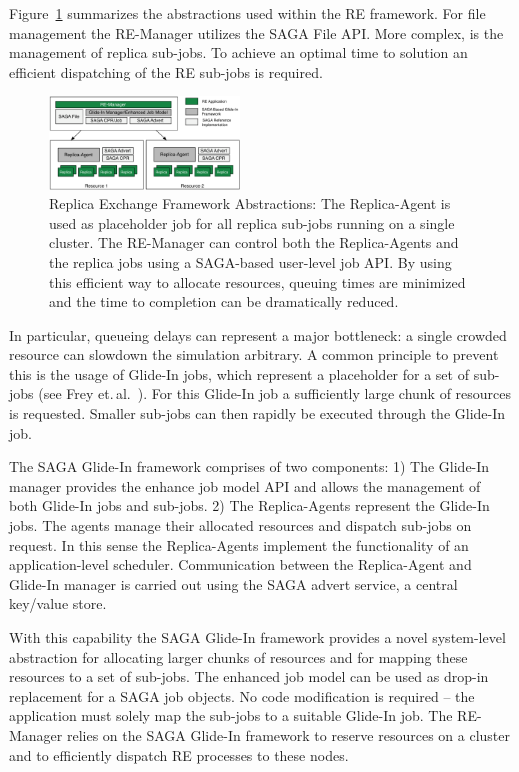 \documentclass[conference,final]{IEEEtran}
\begin{document}
Figure~\ref{fig:remdmanager_v11} summarizes the abstractions used
within the RE framework.  For file management the RE-Manager utilizes
the SAGA File API. More complex, is the management of replica
sub-jobs. To achieve an optimal time to solution an efficient
dispatching of the RE sub-jobs is required.

\begin{figure}[htbp]
    \centering
        \includegraphics[width=0.45\textwidth]{remdmanager_v11.pdf}
    \caption{Replica Exchange Framework Abstractions:      
          The Replica-Agent is used as placeholder job for
          all replica sub-jobs running on a single cluster. The
          RE-Manager can control both the Replica-Agents and the replica
          jobs using a SAGA-based user-level job API. By using this
          efficient way to allocate resources, queuing times are minimized
          and the time to completion can be dramatically reduced.}
    \label{fig:remdmanager_v11}
\end{figure}  

In particular, queueing delays can represent a major bottleneck: a single crowded 
resource can slowdown the simulation arbitrary. A common principle 
to prevent this is the usage of Glide-In jobs, which represent a placeholder 
for a set of sub-jobs (see Frey et.\,al.~\cite{citeulike:291860}). 
For this Glide-In job a sufficiently large chunk of resources 
is requested. Smaller sub-jobs can then rapidly be executed through 
the Glide-In job.

The SAGA Glide-In framework comprises of two components: 1) The Glide-In manager provides 
the enhance job model API and allows the management of both Glide-In jobs and sub-jobs. 
2) The Replica-Agents represent the Glide-In jobs. The agents manage their allocated resources and 
dispatch sub-jobs on request. In this sense the Replica-Agents implement the functionality of 
an application-level scheduler. Communication between the Replica-Agent and Glide-In manager 
is carried out using the SAGA advert service, a central key/value store.

With this capability the SAGA Glide-In framework provides a novel system-level 
abstraction for allocating larger chunks of resources 
and for mapping these resources to a set of sub-jobs. The enhanced job model can 
be used as drop-in replacement for a SAGA job objects. No code modification is required
-- the application must solely map the sub-jobs to a suitable Glide-In job.
The RE-Manager relies on the SAGA Glide-In framework to reserve resources on a cluster
and to efficiently dispatch RE processes to these nodes.
\end{document}
